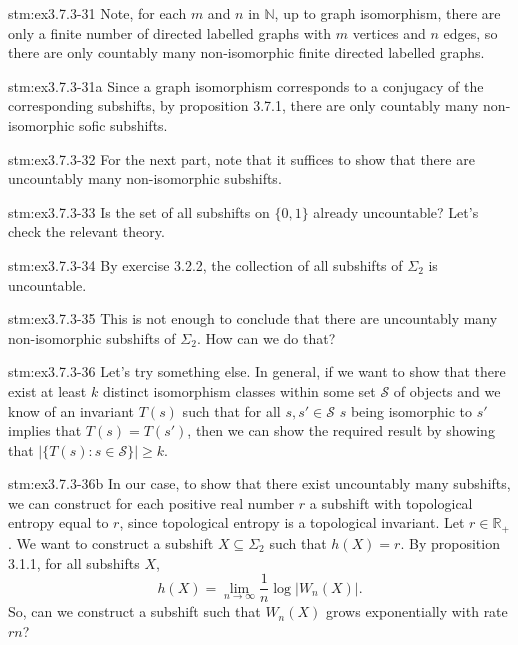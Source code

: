 \begin{statement}{stm:ex3.7.3-31}
Note, for each $m$ and $n$ in $\mathbb{N}$, up to graph isomorphism, there are only a finite number of directed labelled graphs with $m$ vertices and $n$ edges, so there are only countably many non-isomorphic finite directed labelled graphs.
\end{statement}

\begin{statement}{stm:ex3.7.3-31a}
Since a graph isomorphism corresponds to a conjugacy of the corresponding subshifts, by proposition 3.7.1, there are only countably many non-isomorphic sofic subshifts.
\end{statement}

\begin{explanation}{stm:ex3.7.3-32}
For the next part, note that it suffices to show that there are uncountably many non-isomorphic subshifts.
\end{explanation}

\begin{explanation}{stm:ex3.7.3-33}
Is the set of all subshifts on $\{0,1\}$ already uncountable? Let's check the relevant theory.
\end{explanation}

\begin{statement}{stm:ex3.7.3-34}
By exercise 3.2.2, the collection of all subshifts of $\Sigma_2$ is uncountable.
\end{statement}

\begin{explanation}{stm:ex3.7.3-35}
This is not enough to conclude that there are uncountably many non-isomorphic subshifts of $\Sigma_2$. How can we do that?
\end{explanation}

\begin{explanation}{stm:ex3.7.3-36}
Let's try something else. In general, if we want to show that there exist at least $k$ distinct isomorphism classes within some set $\mathcal{S}$ of objects and we know of an invariant $T(s)$ such that for all $s, s' \in \mathcal{S}$ $s$ being isomorphic to $s'$ implies that $T(s) = T(s')$, then we can show the required result by showing that $\left| \{ T(s) : s \in \mathcal{S} \} \right| \geq k$.
\end{explanation}

\begin{explanation}{stm:ex3.7.3-36b}
In our case, to show that there exist uncountably many subshifts, we can construct for each positive real number $r$ a subshift with topological entropy equal to $r$, since topological entropy is a topological invariant. Let $r \in \mathbb{R}_+$. We want to construct a subshift $X \subseteq \Sigma_2$ such that $h(X) = r$. By proposition 3.1.1, for all subshifts $X$, $$h(X) = \lim_{n \to \infty} \frac{1}{n} \log |W_n(X)|.$$ So, can we construct a subshift such that $W_n(X)$ grows exponentially with rate $rn$? 
\end{explanation}

